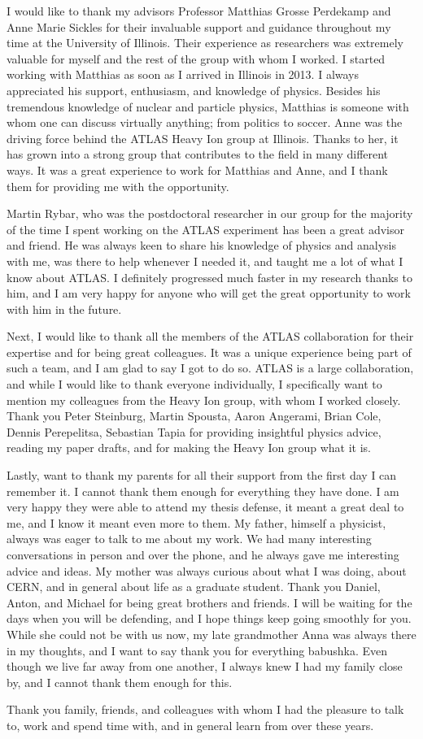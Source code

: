 
I would like to thank my advisors Professor Matthias Grosse Perdekamp and Anne Marie Sickles for their invaluable support and guidance throughout my time at the University of Illinois. Their experience as researchers was extremely valuable for myself and the rest of the group with whom I worked. I started working with Matthias as soon as I arrived in Illinois in 2013. I always appreciated his support, enthusiasm, and knowledge of physics. Besides his tremendous knowledge of nuclear and particle physics, Matthias is someone with whom one can discuss virtually anything; from politics to soccer. Anne was the driving force behind the ATLAS Heavy Ion group at Illinois. Thanks to her, it has grown into a strong group that contributes to the field in many different ways. It was a great experience to work for Matthias and Anne, and I thank them for providing me with the opportunity.

Martin Rybar, who was the postdoctoral researcher in our group for the majority of  the time I spent working on the ATLAS experiment has been a great advisor and friend. He was always keen to share his knowledge of physics and analysis with me, was there to help whenever I needed it, and taught me a lot of what I know about ATLAS. I definitely progressed much faster in my research thanks to him, and I am very happy for anyone who will get the great opportunity to work with him in the future. 

Next, I would like to thank all the members of the ATLAS collaboration for their expertise and for being great colleagues. It was a unique experience being part of such a team, and I am glad to say I got to do so. ATLAS is a large collaboration, and while I would like to thank everyone individually, I specifically want to mention my colleagues from the Heavy Ion group, with whom I worked closely. Thank you Peter Steinburg, Martin Spousta, Aaron Angerami, Brian Cole, Dennis Perepelitsa, Sebastian Tapia for providing insightful physics advice, reading my paper drafts, and for making the Heavy Ion group what it is. 

Lastly, want to thank my parents for all their support from the first day I can remember it. I cannot thank them enough for everything they have done. I am very happy they were able to attend my thesis defense, it meant a great deal to me, and I know it meant even more to them. My father, himself a physicist, always was eager to talk to me about my work. We had many interesting conversations in person and over the phone, and he always gave me interesting advice and ideas. My mother was always curious about what I was doing, about CERN, and in general about life as a graduate student. Thank you Daniel, Anton, and Michael for being great brothers and friends. I will be waiting for the days when you will be defending, and I hope things keep going smoothly for you. While she could not be with us now, my late grandmother Anna was always there in my thoughts, and I want to say thank you for everything babushka. Even though we live far away from one another, I always knew I had my family close by, and I cannot thank them enough for this.

Thank you family, friends, and colleagues with whom I had the pleasure to talk to, work and spend time with, and in general learn from over these years. 
